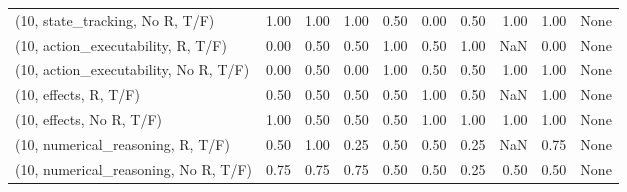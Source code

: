 \begin{table*}[h!]
\begin{adjustbox}{width=2\columnwidth,center}
\begin{tabular}{lrrr|rrr|rrr}
(10, state\_tracking, No R, T/F)       &                      1.00 &                  1.00 &                      1.00 &                          0.50 &                      0.00 &                          0.50 &                                   1.00 &                               1.00 &                                  None \\
(10, action\_executability, R, T/F)    &                      0.00 &                  0.50 &                      0.50 &                          1.00 &                      0.50 &                          1.00 &                                    NaN &                               0.00 &                                  None \\
(10, action\_executability, No R, T/F) &                      0.00 &                  0.50 &                      0.00 &                          1.00 &                      0.50 &                          0.50 &                                   1.00 &                               1.00 &                                  None \\
(10, effects, R, T/F)                 &                      0.50 &                  0.50 &                      0.50 &                          0.50 &                      1.00 &                          0.50 &                                    NaN &                               1.00 &                                  None \\
(10, effects, No R, T/F)              &                      1.00 &                  0.50 &                      0.50 &                          0.50 &                      1.00 &                          1.00 &                                   1.00 &                               1.00 &                                  None \\
(10, numerical\_reasoning, R, T/F)     &                      0.50 &                  1.00 &                      0.25 &                          0.50 &                      0.50 &                          0.25 &                                    NaN &                               0.75 &                                  None \\
(10, numerical\_reasoning, No R, T/F)  &                      0.75 &                  0.75 &                      0.75 &                          0.50 &                      0.50 &                          0.25 &                                   0.50 &                               0.50 &                                  None \\

\end{tabular}
\end{adjustbox}
\end{table*}
